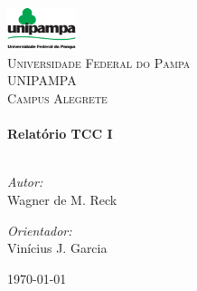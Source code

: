   \begin{titlepage}
  
  \begin{center}
  
  
  \includegraphics[width=0.15\textwidth]{./logoUnipampa}\\[1.2cm]
  
  \textsc{\LARGE Universidade Federal do Pampa\\
UNIPAMPA}\\[1.0cm]

  \textsc{\Large Campus Alegrete}\\[1.5cm]
  
  
  
  \HRule \\[0.4cm]
  { \LARGE \bfseries Relat\'{o}rio TCC I}\\[0.4cm]
  
  \HRule \\[1.5cm]
  
  \begin{minipage}{0.4\textwidth}
  \begin{flushleft} \large
  \emph{Autor:}\\
  Wagner de M. Reck
  \end{flushleft}
  \end{minipage}
  \begin{minipage}{0.4\textwidth}
  \begin{flushright} \large
  \emph{Orientador:} \\
  Vin\'{i}cius J. Garcia
  \end{flushright}
  \end{minipage}
  
  \vfill
  
  {\large \today}
  
  \end{center}
  
  \end{titlepage}
